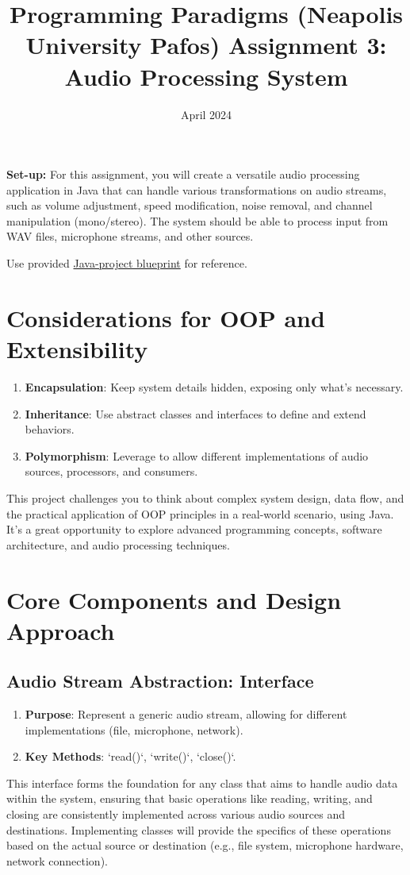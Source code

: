 \documentclass[a4paper,12pt]{article}
\title{Programming Paradigms (Neapolis University Pafos)
  Assignment 3: Audio Processing System}
\date{April 2024}
\begin{document}
\maketitle
\textbf{Set-up:} For this assignment, you will create a versatile audio processing application in Java that can handle various transformations on audio streams, such as volume adjustment, speed modification, noise removal, and channel manipulation (mono/stereo). The system should be able to process input from WAV files, microphone streams, and other sources.

Use provided \href{https://github.com/avalur/avalur.github.io/tree/master/cs_basics/oop_project}{Java-project blueprint} for reference.

\section{Considerations for OOP and Extensibility}
\begin{enumerate}
  \item \textbf{Encapsulation}: Keep system details hidden, exposing only what's necessary.
  \item \textbf{Inheritance}: Use abstract classes and interfaces to define and extend behaviors.
  \item \textbf{Polymorphism}: Leverage to allow different implementations of audio sources, processors, and consumers.
\end{enumerate}

This project challenges you to think about complex system design,
data flow, and the practical application of OOP principles
in a real-world scenario, using Java.
It's a great opportunity to explore advanced programming concepts,
software architecture, and audio processing techniques.

\section{Core Components and Design Approach}
\subsection{Audio Stream Abstraction: Interface}
\begin{enumerate}
    \item \textbf{Purpose}: Represent a generic audio stream, allowing
    for different implementations (file, microphone, network).
    \item \textbf{Key Methods}: `read()`, `write()`, `close()`.
\end{enumerate}
This interface forms the foundation for any class that aims to handle audio data within the system,
ensuring that basic operations like reading, writing, and closing are consistently implemented across various audio sources and destinations.
Implementing classes will provide the specifics of these operations based on the actual source or destination (e.g., file system, microphone hardware, network connection).
\end{document}
